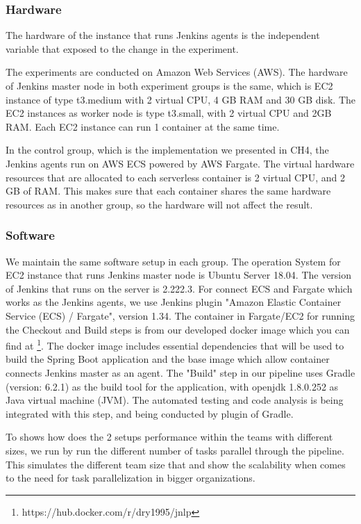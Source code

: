 \subsubsection{Hardware}
The hardware of the instance that runs Jenkins agents is the independent variable that exposed to the change in the experiment.
\par
The experiments are conducted on Amazon Web Services (AWS). The hardware of Jenkins master node in both experiment groups is the same, which is EC2 instance of type t3.medium with 2 virtual CPU, 4 GB RAM and 30 GB disk. The EC2 instances as worker node is type t3.small, with 2 virtual CPU and 2GB RAM. Each EC2 instance can run 1 container at the same time.
\par
In the control group, which is the implementation we presented in CH4, the Jenkins agents run on AWS ECS powered by AWS Fargate. The virtual hardware resources that are allocated to each serverless container is 2 virtual CPU, and 2 GB of RAM. This makes sure that each container shares the same hardware resources as in another group, so the hardware will not affect the result.
\subsubsection{Software}
We maintain the same software setup in each group. The operation System for EC2 instance that runs Jenkins master node is Ubuntu Server 18.04. The version of Jenkins that runs on the server is 2.222.3. For connect ECS and Fargate which works as the Jenkins agents, we use Jenkins plugin "Amazon Elastic Container Service (ECS) / Fargate", version 1.34. The container in Fargate/EC2 for running the Checkout and Build steps is from our developed docker image which you can find at \footnote{https://hub.docker.com/r/dry1995/jnlp}. The docker image includes essential dependencies that will be used to build the Spring Boot application and the base image which allow container connects Jenkins master as an agent. The "Build" step in our pipeline uses Gradle (version: 6.2.1) as the build tool for the application, 
with openjdk 1.8.0.252 as Java virtual machine (JVM). The automated testing and code analysis is being integrated with this step, and being conducted by plugin of Gradle.
\par
To shows how does the 2 setups performance within the teams with different sizes, we run by run the different number of tasks parallel through the pipeline. This simulates the different team size that  and show the scalability when comes to the need for task parallelization in bigger organizations.

